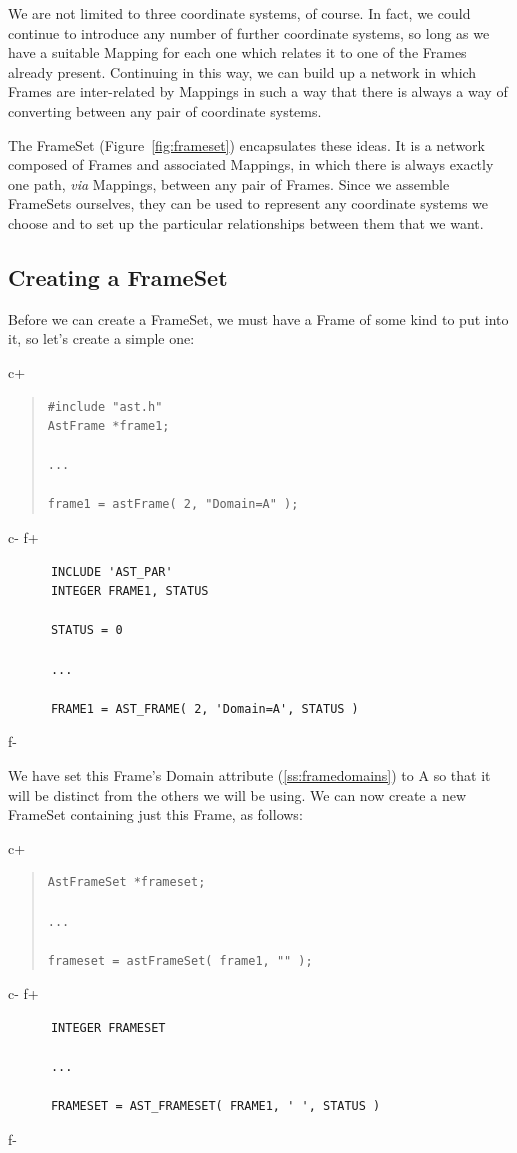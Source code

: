 \documentclass[twoside,11pt]{article}
\newcommand{\secref}[1]{\S\ref{#1}}
\renewcommand{\secref}[1]{\ref{#1}}
\begin{document}
We are not limited to three coordinate systems, of course. In fact, we
could continue to introduce any number of further coordinate systems,
so long as we have a suitable Mapping for each one which relates it to
one of the Frames already present. Continuing in this way, we can
build up a network in which Frames are inter-related by Mappings in
such a way that there is always a way of converting between any pair
of coordinate systems.

The FrameSet (Figure~\ref{fig:frameset}) encapsulates these ideas.  It
is a network composed of Frames and associated Mappings, in which
there is always exactly one path, {\em{via}} Mappings, between any
pair of Frames.  Since we assemble FrameSets ourselves, they can be
used to represent any coordinate systems we choose and to set up the
particular relationships between them that we want.

\subsection{\label{ss:creatingaframeset}Creating a FrameSet}

Before we can create a FrameSet, we must have a Frame of some kind to
put into it, so let's create a simple one:

c+
\begin{quote}
\small
\begin{verbatim}
#include "ast.h"
AstFrame *frame1;

...

frame1 = astFrame( 2, "Domain=A" );
\end{verbatim}
\normalsize
\end{quote}
c-
f+
\small
\begin{verbatim}
      INCLUDE 'AST_PAR'
      INTEGER FRAME1, STATUS

      STATUS = 0

      ...

      FRAME1 = AST_FRAME( 2, 'Domain=A', STATUS )
\end{verbatim}
\normalsize
f-

We have set this Frame's Domain attribute (\secref{ss:framedomains}) to
A so that it will be distinct from the others we will be using. We can
now create a new FrameSet containing just this Frame, as follows:

c+
\begin{quote}
\small
\begin{verbatim}
AstFrameSet *frameset;

...

frameset = astFrameSet( frame1, "" );
\end{verbatim}
\normalsize
\end{quote}
c-
f+
\small
\begin{verbatim}
      INTEGER FRAMESET

      ...

      FRAMESET = AST_FRAMESET( FRAME1, ' ', STATUS )
\end{verbatim}
\normalsize
f-
\end{document}
